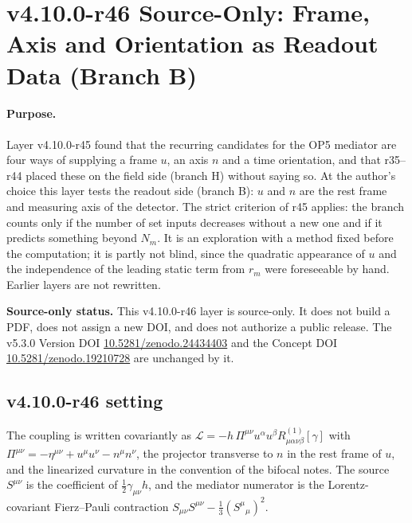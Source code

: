 \clearpage
\section*{v4.10.0-r46 Source-Only: Frame, Axis and Orientation as Readout Data (Branch B)}
\label{sec:v4100-r46-readout-branch}

\paragraph{Purpose.}
Layer v4.10.0-r45 found that the recurring candidates for the OP5 mediator are four ways of supplying a frame \(u\), an axis \(n\) and a time
orientation, and that r35--r44 placed these on the field side (branch H) without saying so.  At the author's choice this layer tests the readout
side (branch B): \(u\) and \(n\) are the rest frame and measuring axis of the detector.  The strict criterion of r45 applies: the branch counts only if the
number of set inputs decreases without a new one and if it predicts something beyond \(N_m\).  It is an exploration with a method fixed before the
computation; it is partly not blind, since the quadratic appearance of \(u\) and the independence of the leading static term from \(r_m\) were
foreseeable by hand.  Earlier layers are not rewritten.

\noindent\textbf{Source-only status.}
This v4.10.0-r46 layer is source-only.  It does not build a PDF, does not assign a new DOI,
and does not authorize a public release.  The v5.3.0 Version DOI
\href{https://doi.org/10.5281/zenodo.24434403}{10.5281/zenodo.24434403} and the Concept DOI
\href{https://doi.org/10.5281/zenodo.19210728}{10.5281/zenodo.19210728} are unchanged by it.

\subsection*{v4.10.0-r46 setting}
\label{subsec:v4100-r46-setting}

The coupling is written covariantly as \(\mathcal L=-h\,\Pi^{\mu\nu}u^\alpha u^\beta R^{(1)}_{\mu\alpha\nu\beta}[\gamma]\) with \(\Pi^{\mu\nu}=-\eta^{\mu\nu}+u^\mu u^\nu-n^\mu n^\nu\), the projector
transverse to \(n\) in the rest frame of \(u\), and the linearized curvature in the convention of the bifocal notes.  The source \(S^{\mu\nu}\) is the coefficient
of \(\tfrac12\gamma_{\mu\nu}h\), and the mediator numerator is the Lorentz-covariant Fierz--Pauli contraction \(S_{\mu\nu}S^{\mu\nu}-\tfrac13(S^\mu{}_\mu)^2\).

